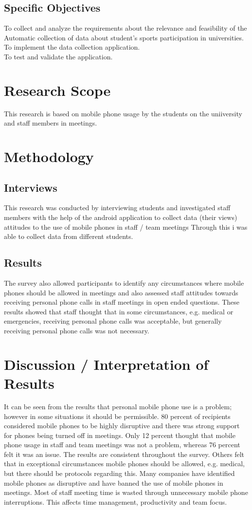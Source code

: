 \documentclass[12pt]{article}
\begin{document}
\subsection{Specific Objectives}
To collect and analyze the requirements about the relevance and feasibility of the Automatic collection of data about student's sports participation in universities.\\ 
To implement the data collection application.\\
To test and validate the application.\\
\section{Research Scope}
This research is based on mobile phone usage by the students on the uniiversity and staff members in meetings.

\section{Methodology}
\subsection{Interviews}
This research was conducted by interviewing students  and investigated staff members with the help of the android application to collect data (their views) attitudes to the use of mobile phones in staff / team meetings
Through this i was able to collect data from different students.

\subsection{Results}
The survey also allowed participants to identify any circumstances where mobile phones should be allowed in meetings and also assessed staff attitudes towards receiving personal phone calls in staff meetings in open ended questions. These results showed that staff thought that in some circumstances, e.g. medical or emergencies, receiving personal phone calls was acceptable, but generally receiving personal phone calls was not necessary. 
\section{Discussion / Interpretation of Results}
It can be seen from the results that personal mobile phone use is a problem; however in some situations it should be permissible. 80 percent of recipients considered mobile phones to be highly disruptive and there was strong support for phones being turned off in meetings. Only 12 percent thought that mobile phone usage in staff and team meetings was not a problem, whereas 76 percent felt it was an issue. The results are consistent throughout the survey. Others felt that in exceptional circumstances mobile phones should be allowed, e.g. medical, but there should be protocols regarding this. Many companies have identified mobile phones as disruptive and have banned the use of mobile phones in meetings. Most of staff meeting time is wasted through unnecessary mobile phone interruptions. This affects time management, productivity and team focus.
\end{document}
